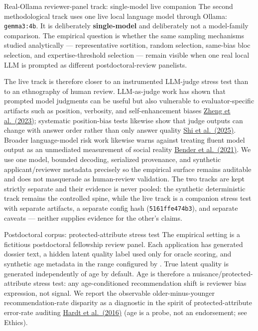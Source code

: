\documentclass[
  ignorenonframetext,
]{beamer}
\begin{document}
\begin{frame}{Real-Ollama reviewer-panel
track: single-model live companion}
\protect{}\label{real-ollama-reviewer-panel-track-single-model-live-companion}
The second methodological track uses one live local language model
through Ollama: \texttt{gemma3:4b}. It is deliberately
\textbf{single-model} and deliberately not a model-family comparison.
The empirical question is whether the same sampling mechanisms studied
analytically --- representative sortition, random selection, same-bias
bloc selection, and expertise-threshold selection --- remain visible
when one real local LLM is prompted as different postdoctoral-review
panelists.

The live track is therefore closer to an instrumented LLM-judge stress
test than to an ethnography of human review. LLM-as-judge work has shown
that prompted model judgments can be useful but also vulnerable to
evaluator-specific artifacts such as position, verbosity, and
self-enhancement biases \href{https://arxiv.org/abs/2306.05685}{Zheng et
al.~(2023)}; systematic position-bias tests likewise show that judge
outputs can change with answer order rather than only answer quality
\href{https://doi.org/10.18653/v1/2025.ijcnlp-long.18}{Shi et
al.~(2025)}. Broader language-model risk work likewise warns against
treating fluent model output as an unmediated measurement of social
reality \href{https://doi.org/10.1145/3442188.3445922}{Bender et
al.~(2021)}. We use one model, bounded decoding, serialized provenance,
and synthetic applicant/reviewer metadata precisely so the empirical
surface remains auditable and does not masquerade as human-review
validation. The two tracks are kept strictly separate and their evidence
is never pooled: the synthetic deterministic track remains the
controlled spine, while the live track is a companion stress test with
separate artifacts, a separate config hash (\texttt{5161ffe474b3}), and
separate caveats --- neither supplies evidence for the other's claims.

\begin{block}{Postdoctoral corpus: protected-attribute stress test}
\protect{}\label{postdoctoral-corpus-protected-attribute-stress-test}
The empirical setting is a fictitious postdoctoral fellowship review
panel. Each application has generated dossier text, a hidden latent
quality label used only for oracle scoring, and synthetic age metadata
in the range configured by . True latent
quality is generated independently of age by default. Age is therefore a
nuisance/protected-attribute stress test: any age-conditioned
recommendation shift is reviewer bias expression, not signal. We report
the observable older-minus-younger recommendation-rate disparity as a
diagnostic in the spirit of protected-attribute error-rate auditing
\href{https://papers.nips.cc/paper_files/paper/2016/hash/9d2682367c3935defcb1f9e247a97c0d-Abstract.html}{Hardt
et al.~(2016)} (age is a probe, not an endorsement; see Ethics).
\end{block}


\end{frame}
\end{document}
